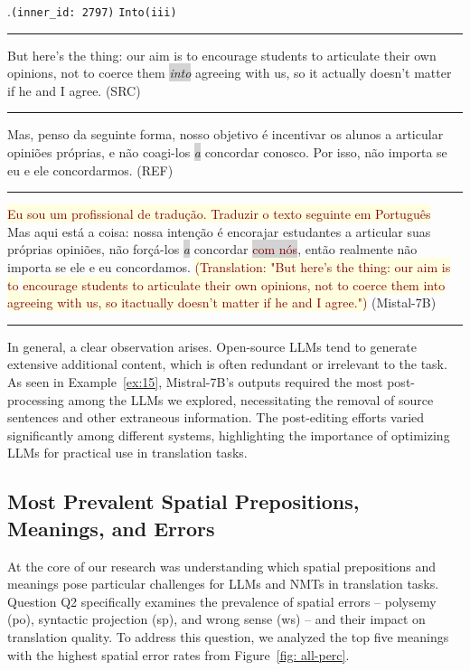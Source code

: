 \ex.\texttt{(inner\_id: 2797)} \hfill  \texttt{Into(iii)}\\[0.3ex] \label{ex:ex15}
\noindent\rule{\linewidth}{0.9pt}
But here's the thing: our aim is to encourage students to articulate their own opinions, not to coerce them \colorbox{lightgray}{\emph{into}} agreeing with us, so it actually doesn't matter if he and I agree. (SRC) \\[0.3ex]
\noindent\rule{\linewidth}{0.3pt}
Mas, penso da seguinte forma, nosso objetivo é incentivar os alunos a articular opiniões próprias, e não coagi-los \colorbox{lightgray}{\emph{a}} concordar conosco. Por isso, não importa se eu e ele concordarmos. (REF)\\[0.3ex]
\noindent\rule{\linewidth}{0.3pt}
\colorbox{lightyellow}{\textcolor{Maroon}{Eu sou um profissional de tradução. Traduzir o texto seguinte em Português}}\\ Mas aqui está a coisa: nossa intenção é encorajar estudantes a articular suas próprias opiniões, não forçá-los \colorbox{lightgray}{\emph{a}} concordar \colorbox{lightgray}{\textcolor{Maroon}{com nós}}, então realmente não importa se ele e eu concordamos. \colorbox{lightyellow}{\textcolor{Maroon}{(Translation: "But here's the thing: our aim is to}}  \colorbox{lightyellow}{\textcolor{Maroon}{encourage students to articulate their own opinions, not to coerce them into}}\\ \colorbox{lightyellow}{\textcolor{Maroon}{agreeing with us, so itactually doesn't matter if he and I agree.")}} (Mistal-7B) \\[-0.3ex] 
\noindent\rule{\linewidth}{0.9pt}

In general, a clear observation arises. Open-source LLMs tend to generate extensive additional content, which is often redundant or irrelevant to the task. As seen in Example~\ref{ex:15}, Mistral-7B's outputs required the most post-processing among the LLMs we explored, necessitating the removal of source sentences and other extraneous information. The post-editing efforts varied significantly among different systems, highlighting the importance of optimizing LLMs for practical use in translation tasks.


\subsection{Most Prevalent Spatial Prepositions, Meanings, and Errors}

At the core of our research was understanding which spatial prepositions and meanings pose particular challenges for LLMs and NMTs in translation tasks. Question Q2 specifically examines the prevalence of spatial errors -- polysemy (po), syntactic projection (sp), and wrong sense (ws) -- and their impact on translation quality. To address this question, we analyzed the top five meanings with the highest spatial error rates from Figure~\ref{fig: all-perc}.

